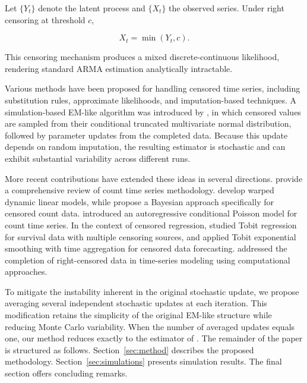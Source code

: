 \documentclass[10pt,twoside]{article}
\numberwithin{equation}{section}
\begin{document}
Let $\{Y_t\}$ denote the latent process and $\{X_t\}$ the observed series. Under right censoring at threshold $c$,

\begin{equation}\label{eq:minYc}

X_t = \min(Y_t,c).

\end{equation}

This censoring mechanism produces a mixed discrete-continuous likelihood, rendering standard ARMA estimation analytically intractable.



Various methods have been proposed for handling censored time series, including substitution rules, approximate likelihoods, and imputation-based techniques. A simulation-based EM-like algorithm was introduced by \cite{park2007}, in which censored values are sampled from their conditional truncated multivariate normal distribution, followed by parameter updates from the completed data. Because this update depends on random imputation, the resulting estimator is stochastic and can exhibit substantial variability across different runs.



More recent contributions have extended these ideas in several directions. \cite{davis2021} provide a comprehensive review of count time series methodology. \cite{king2025} develop warped dynamic linear models, while \cite{silva2023} propose a Bayesian approach specifically for censored count data. \cite{heinen2003} introduced an autoregressive conditional Poisson model for count time series. In the context of censored regression, \cite{gong2018} studied Tobit regression for survival data with multiple censoring sources, and \cite{pedregal2024} applied Tobit exponential smoothing with time aggregation for censored data forecasting. \cite{yilmaz2019} addressed the completion of right-censored data in time-series modeling using computational approaches.



To mitigate the instability inherent in the original stochastic update, we propose averaging several independent stochastic updates at each iteration. This modification retains the simplicity of the original EM-like structure while reducing Monte Carlo variability. When the number of averaged updates equals one, our method reduces exactly to the estimator of \cite{park2007}. The remainder of the paper is structured as follows. Section~\ref{sec:method} describes the proposed methodology. Section~\ref{sec:simulations} presents simulation results. The final section offers concluding remarks.
\end{document}
